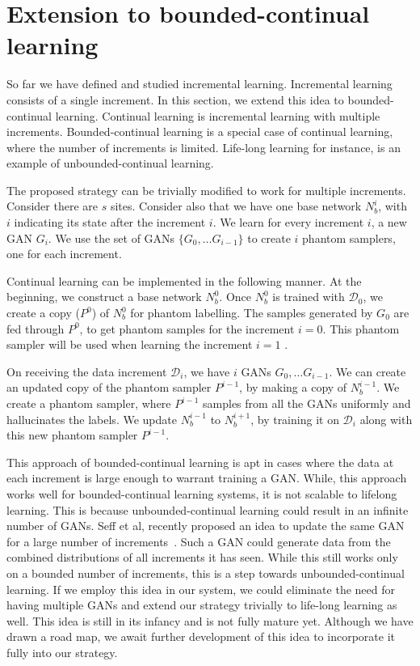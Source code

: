 \documentclass[10pt,twocolumn,letterpaper]{article}
\def \cD{{\mathcal{D}}}
\begin{document}
	\section{Extension to bounded-continual learning}
	So far we have defined and studied incremental learning. 
	Incremental learning consists of a single increment. 
	In this section, we extend this idea to bounded-continual learning.
	Continual learning is incremental learning with multiple increments. 
	Bounded-continual learning is a special case of continual learning, where the number of increments is limited. 
	Life-long learning for instance, is an example of unbounded-continual learning. 
	
	The proposed strategy can be trivially modified to work for multiple increments.
	Consider there are $s$ sites.
	Consider also that we have one base network $N_b^i$, with $i$ indicating its state after the increment $i$.
	We learn for every increment $i$, a new GAN $G_i$. 
	We use the set of GANs $\{G_0, \dots G_{i-1}\}$ to create $i$ phantom samplers, one for each increment. 
	
	Continual learning can be implemented in the following manner.
	At the beginning, we construct a base network $N_b^0$. 
	Once $N_b^0$ is trained with $\cD_0$, we create a copy ($P^0$) of $N_b^0$ for phantom labelling.
	The samples generated by $G_0$ are fed through $P^0$, to get phantom samples for the increment $i = 0$.
	This phantom sampler will be used when learning the increment $i=1$ .
	
	On receiving the data increment $\cD_i$, we have $i$ GANs $G_0, \dots G_{i-1}$.
	We can create an updated copy of the phantom sampler $P^{i-1}$, by making a copy of $N_b^{i-1}$. 
	We create a phantom sampler, where $P^{i-1}$ samples from all the GANs uniformly and hallucinates the labels. 
	We update $N_b^{i-1}$ to $N_b^{i+1}$, by training it on $\cD_i$ along with this new phantom sampler $P^{i-1}$.
	
	This approach of bounded-continual learning is apt in cases where the data at each increment is large enough to warrant training a GAN. 
	While, this approach works well for bounded-continual learning systems, it is not scalable to lifelong learning. 
	This is because unbounded-continual learning could result in an infinite number of GANs. 
	Seff et al, recently proposed an idea to update the same GAN for a large number of increments~\cite{seff2017continual}.
	Such a GAN could generate data from the combined distributions of all increments it has seen. 
	While this still works only on a bounded number of increments, this is a step towards unbounded-continual learning.
	If we employ this idea in our system, we could eliminate the need for having multiple GANs and extend our strategy trivially to life-long learning as well. 
	This idea is still in its infancy and is not fully mature yet.
	Although we have drawn a road map, we await further development of this idea to incorporate it fully into our strategy.
	
\end{document}
